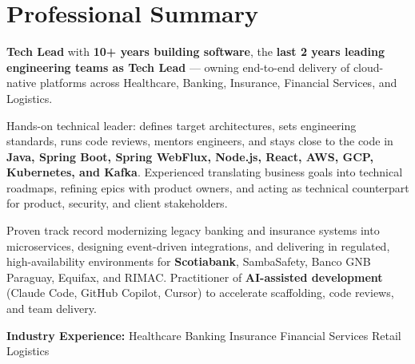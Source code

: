 
\section{Professional Summary}

{\small
\textbf{Tech Lead} with \textbf{10+ years building software}, the \textbf{last 2 years leading
engineering teams as Tech Lead} — owning end-to-end delivery of cloud-native platforms across
Healthcare, Banking, Insurance, Financial Services, and Logistics.

\vspace{4pt}
Hands-on technical leader: defines target architectures, sets engineering standards, runs code
reviews, mentors engineers, and stays close to the code in \textbf{Java, Spring Boot, Spring
WebFlux, Node.js, React, AWS, GCP, Kubernetes, and Kafka}. Experienced translating business goals
into technical roadmaps, refining epics with product owners, and acting as technical counterpart
for product, security, and client stakeholders.

\vspace{4pt}
Proven track record modernizing legacy banking and insurance systems into microservices, designing
event-driven integrations, and delivering in regulated, high-availability environments for
\textbf{Scotiabank}, SambaSafety, Banco GNB Paraguay, Equifax, and RIMAC. Practitioner of
\textbf{AI-assisted development} (Claude Code, GitHub Copilot, Cursor) to accelerate scaffolding,
code reviews, and team delivery.
}

\vspace{4pt}
{\small\color{cvMuted}%
  \textbf{Industry Experience:}\enspace%
  Healthcare\enspace\textbar\enspace
  Banking\enspace\textbar\enspace
  Insurance\enspace\textbar\enspace
  Financial Services\enspace\textbar\enspace
  Retail\enspace\textbar\enspace
  Logistics%
}
